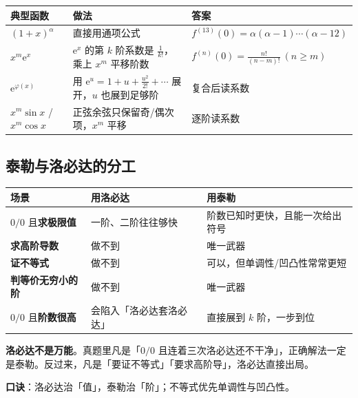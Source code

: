 \documentclass[11pt,a4paper]{ctexart}
\newcommand{\ee}{\mathrm{e}}
\begin{document}
\begin{center}
\footnotesize
\renewcommand{\arraystretch}{1.25}
\begin{tabularx}{\textwidth}{@{}l l X@{}}
\toprule
\textbf{典型函数} & \textbf{做法} & \textbf{答案}\\
\midrule
$(1+x)^{\alpha}$ & 直接用通项公式 &
$f^{(13)}(0)=\alpha(\alpha-1)\cdots(\alpha-12)$\\
$x^{m}\ee^{x}$ & $\ee^{x}$ 的第 $k$ 阶系数是 $\frac1{k!}$，乘上 $x^{m}$ 平移阶数 &
$f^{(n)}(0)=\frac{n!}{(n-m)!}\ (n\ge m)$\\
$\ee^{\varphi(x)}$ & 用 $\ee^{u}=1+u+\frac{u^{2}}{2!}+\cdots$ 展开，$u$ 也展到足够阶 &
复合后读系数\\
$x^{m}\sin x$ / $x^{m}\cos x$ & 正弦余弦只保留奇/偶次项，$x^{m}$ 平移 &
逐阶读系数\\
\bottomrule
\end{tabularx}
\end{center}

\subsection{泰勒与洛必达的分工}

\begin{center}
\footnotesize
\renewcommand{\arraystretch}{1.35}
\begin{tabularx}{\textwidth}{@{}l X X@{}}
\toprule
\textbf{场景} & \textbf{用洛必达} & \textbf{用泰勒}\\
\midrule
$0/0$ 且\textbf{求极限值} & 一阶、二阶往往够快 & 阶数已知时更快，且能一次给出符号\\
\textbf{求高阶导数} & 做不到 & 唯一武器\\
\textbf{证不等式} & 做不到 & 可以，但单调性/凹凸性常常更短\\
\textbf{判等价无穷小的阶} & 做不到 & 唯一武器\\
$0/0$ 且\textbf{阶数很高} & 会陷入「洛必达套洛必达」&
直接展到 $k$ 阶，一步到位\\
\bottomrule
\end{tabularx}
\end{center}

\begin{warnbox}[考场上的取舍]
\textbf{洛必达不是万能}。真题里凡是「$0/0$ 且连着三次洛必达还不干净」，正确解法一定是泰勒。反过来，凡是「要证不等式」「要求高阶导」，洛必达直接出局。

\textbf{口诀}：洛必达治「值」，泰勒治「阶」；不等式优先单调性与凹凸性。
\end{warnbox}
\end{document}
